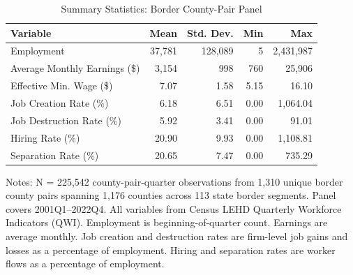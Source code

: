 \begin{table}[H]
\centering
\caption{Summary Statistics: Border County-Pair Panel}
\label{tab:summary}
\begin{threeparttable}
\begin{tabular}{lrrrr}
\toprule
Variable & Mean & Std. Dev. & Min & Max \\
\midrule
Employment & 37,781 & 128,089 & 5 & 2,431,987 \\
Average Monthly Earnings (\$) & 3,154 & 998 & 760 & 25,906 \\
Effective Min. Wage (\$) & 7.07 & 1.58 & 5.15 & 16.10 \\
Job Creation Rate (\%) & 6.18 & 6.51 & 0.00 & 1,064.04 \\
Job Destruction Rate (\%) & 5.92 & 3.41 & 0.00 & 91.01 \\
Hiring Rate (\%) & 20.90 & 9.93 & 0.00 & 1,108.81 \\
Separation Rate (\%) & 20.65 & 7.47 & 0.00 & 735.29 \\
\bottomrule
\end{tabular}
\begin{tablenotes}[flushleft]
\small
\item Notes: N = 225,542 county-pair-quarter observations from 1,310 unique border county pairs spanning 1,176 counties across 113 state border segments. Panel covers 2001Q1--2022Q4. All variables from Census LEHD Quarterly Workforce Indicators (QWI). Employment is beginning-of-quarter count. Earnings are average monthly. Job creation and destruction rates are firm-level job gains and losses as a percentage of employment. Hiring and separation rates are worker flows as a percentage of employment.
\end{tablenotes}
\end{threeparttable}
\end{table}
